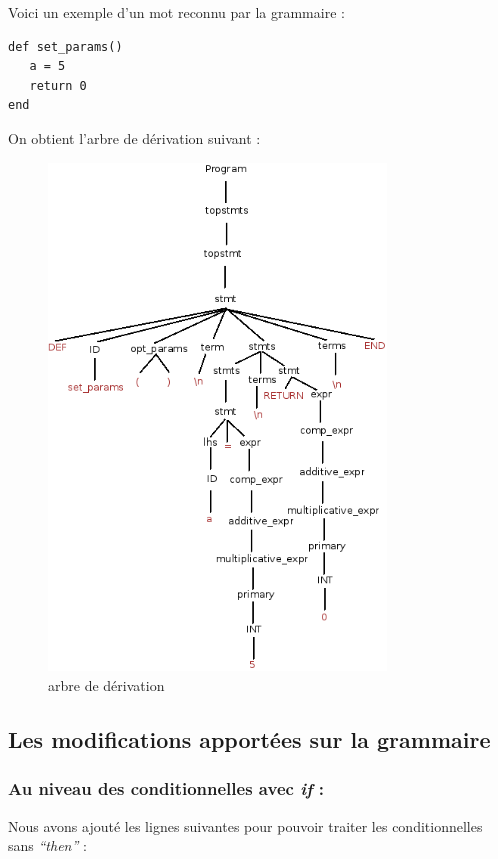 \documentclass{article}
\begin{document}
Voici un exemple d'un mot reconnu par la grammaire :
\begin{verbatim}
def set_params()
   a = 5
   return 0
end 
\end{verbatim}

On obtient l'arbre de dérivation suivant :

\newpage
\begin{figure}[!h]
\includegraphics[width=0.8\textwidth]{Diagramme1.png}
\caption{arbre de dérivation}
\end{figure}


\subsection{Les modifications apportées sur la grammaire}
\subsubsection*{Au niveau des conditionnelles avec \emph{if} :}
\noindent Nous avons ajouté les lignes suivantes pour pouvoir traiter les conditionnelles sans \emph{``then''} : \\
\end{document}
